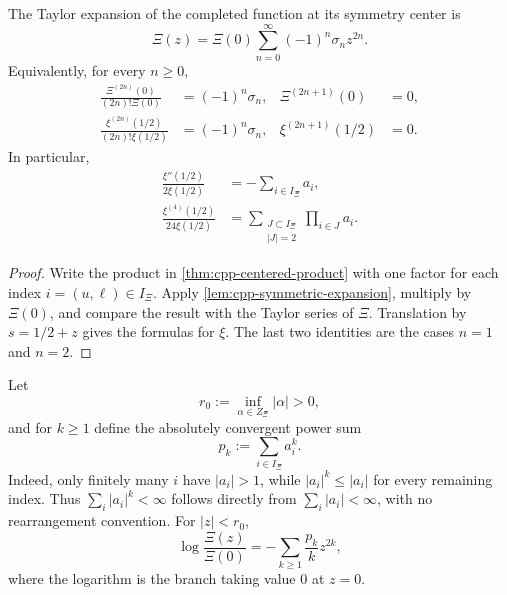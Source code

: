 \begin{theorem}
\label{thm:cpp-centered-taylor}
The Taylor expansion of the completed function at its symmetry center is
\begin{equation}
\label{eq:cpp-Xi-taylor}
 \Xi(z)
 =
 \Xi(0)\sum_{n=0}^{\infty}(-1)^n\sigma_nz^{2n}.
\end{equation}
Equivalently, for every \(n\geq0\),
\begin{align}
\label{eq:cpp-Xi-derivative-coordinates}
 \frac{\Xi^{(2n)}(0)}{(2n)!\Xi(0)}
 &=
 (-1)^n\sigma_n,
 &
 \Xi^{(2n+1)}(0)&=0,\\
\label{eq:cpp-xi-derivative-coordinates}
 \frac{\xi^{(2n)}(1/2)}{(2n)!\xi(1/2)}
 &=
 (-1)^n\sigma_n,
 &
 \xi^{(2n+1)}(1/2)&=0.
\end{align}
In particular,
\begin{align}
\label{eq:cpp-second-central-derivative}
 \frac{\xi''(1/2)}{2\xi(1/2)}
 &=
 -\sum_{i\in I_\Xi}a_i,\\
\label{eq:cpp-fourth-central-derivative}
 \frac{\xi^{(4)}(1/2)}{24\xi(1/2)}
 &=
 \sum_{\substack{J\subset I_\Xi\\|J|=2}}
 \prod_{i\in J}a_i.
\end{align}
\end{theorem}

\begin{proof}
Write the product in \cref{thm:cpp-centered-product} with one factor for each
index \(i=(u,\ell)\in I_\Xi\).  Apply
\cref{lem:cpp-symmetric-expansion}, multiply by \(\Xi(0)\), and compare the
result with the Taylor series of \(\Xi\).  Translation by
\(s=1/2+z\) gives the formulas for \(\xi\).  The last two identities are the
cases \(n=1\) and \(n=2\).
\end{proof}

\begin{proposition}
\label{prop:cpp-power-sum-log}
Let
\[
 r_0:=\inf_{\alpha\in Z_\Xi}|\alpha|>0,
\]
and for \(k\geq1\) define the absolutely convergent power sum
\[
 p_k:=\sum_{i\in I_\Xi}a_i^k.
\]
Indeed, only finitely many \(i\) have \(|a_i|>1\), while
\(|a_i|^k\leq|a_i|\) for every remaining index.  Thus
\(\sum_i|a_i|^k<\infty\) follows directly from
\(\sum_i|a_i|<\infty\), with no rearrangement convention.
For \(|z|<r_0\),
\begin{equation}
\label{eq:cpp-power-sum-log}
 \log\frac{\Xi(z)}{\Xi(0)}
 =
 -\sum_{k\geq1}\frac{p_k}{k}z^{2k},
\end{equation}
where the logarithm is the branch taking value \(0\) at \(z=0\).
\end{proposition}


